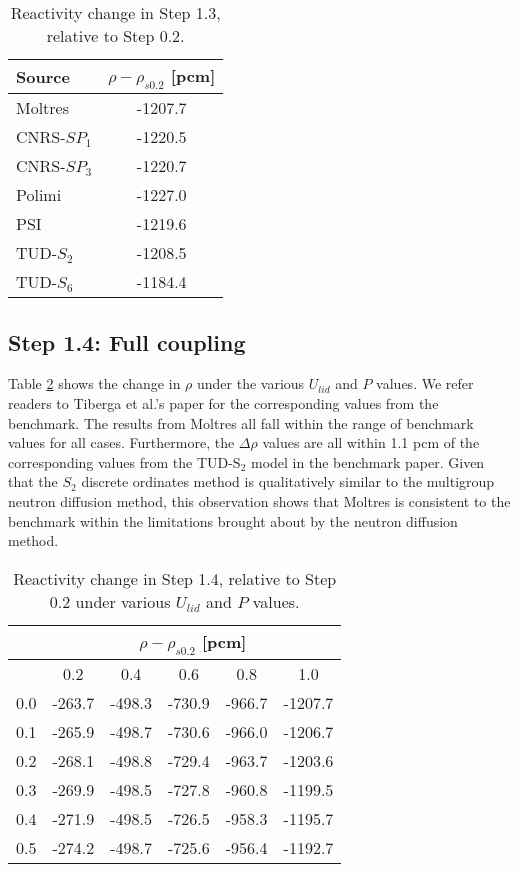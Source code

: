 \begin{table}[htbp!]
    \caption{Reactivity change in Step 1.3, relative to Step 0.2.}
    \centering
    \footnotesize
    \setlength\tabcolsep{1.5pt}
    \begin{tabular}{l S}
        \toprule
        \textbf{Source} & {$\rho - \rho_{s0.2}$ [pcm]} \\
        \midrule
        Moltres \hspace{3cm} & -1207.7 \\
        CNRS-$SP_1$ & -1220.5 \\
        CNRS-$SP_3$ & -1220.7 \\
        Polimi & -1227.0 \\
        PSI & -1219.6 \\
        TUD-$S_2$ & -1208.5 \\
        TUD-$S_6$ & -1184.4 \\
        \bottomrule
    \end{tabular}
    \label{table:rho13}
\end{table}

\subsection{Step 1.4: Full coupling}

Table \ref{table:full} shows the change in $\rho$ under the various $U_{lid}$
and $P$ values. We refer readers to Tiberga et al.'s paper
\cite{tiberga_results_2020} for the corresponding values from the benchmark.
The results from Moltres all fall within the range of benchmark values for all
cases. Furthermore, the $\Delta\rho$ values are all within 1.1 pcm of the
corresponding values from the TUD-S$_2$ model in the benchmark paper. Given
that the $S_2$ discrete ordinates method is qualitatively similar to the
multigroup neutron diffusion method, this observation shows that Moltres is
consistent to the benchmark within the limitations brought about by the neutron
diffusion method.

\begin{table}[htbp!]
	\caption{Reactivity change in Step 1.4, relative to Step 0.2 under various
	$U_{lid}$ and $P$ values.}
	\centering
	\small
	\setlength\tabcolsep{1.5pt}
	\begin{tabular}{c c c c c c}
		\toprule
		& \multicolumn{5}{c}{$\rho - \rho_{s0.2}$ [pcm]} \\
		\midrule
		{\backslashbox{$U_{lid}$ [m$\cdot$s$^{-1}$]}{$P$ [GW]}} & 0.2 & 0.4 & 0.6 & 0.8 & 1.0 \\
		\midrule
		0.0 & -263.7 & -498.3 & -730.9 & -966.7 & -1207.7 \\
		0.1 & -265.9 & -498.7 & -730.6 & -966.0 & -1206.7 \\
		0.2 & -268.1 & -498.8 & -729.4 & -963.7 & -1203.6 \\
		0.3 & -269.9 & -498.5 & -727.8 & -960.8 & -1199.5 \\
		0.4 & -271.9 & -498.5 & -726.5 & -958.3 & -1195.7 \\
		0.5 & -274.2 & -498.7 & -725.6 & -956.4 & -1192.7 \\
		\bottomrule
	\end{tabular}
	\label{table:full}
\end{table}
